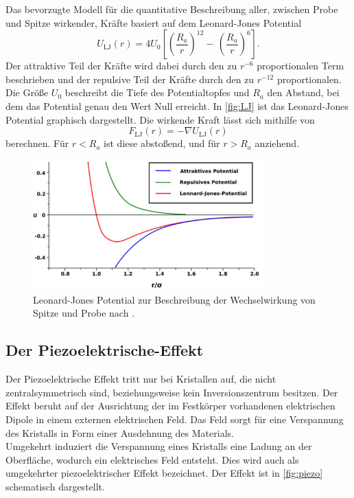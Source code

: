 Das bevorzugte Modell für die quantitative Beschreibung aller, zwischen Probe und Spitze wirkender, Kräfte basiert auf dem Leonard-Jones Potential
\begin{equation}
  U_{\text{LJ}}(r) = 4U_0\left[\left(\frac{R_a}{r}\right)^{12}-\,\left(\frac{R_a}{r}\right)^6\right].
\end{equation}
Der attraktive Teil der Kräfte wird dabei durch den zu $r^{-6}$ proportionalen Term beschrieben und der repulsive Teil der Kräfte durch den zu $r^{-12}$ proportionalen.
Die Größe $U_0$ beschreibt die Tiefe des Potentialtopfes und $R_a$ den Abstand, bei dem das Potential genau den Wert Null erreicht. In \autoref{fig:LJ} ist das Leonard-Jones Potential graphisch dargestellt.
Die wirkende Kraft lässt sich mithilfe von
\begin{equation}
  F_{\text{LJ}}(r) = - \nabla U_{\text{LJ}}(r)
\end{equation}
berechnen. Für $r<R_a$ ist diese abstoßend, und für $r>R_a$ anziehend.
\begin{figure}[H]
  \centering
  \includegraphics[width=0.8\textwidth]{content/plots/LJ.jpg}
  \caption{Leonard-Jones Potential zur Beschreibung der Wechselwirkung von Spitze und Probe nach \cite{Voigt}.}
  \label{fig:LJ}
\end{figure}
\subsection{Der Piezoelektrische-Effekt}
Der Piezoelektrische Effekt tritt nur bei Kristallen auf, die nicht zentralsymmetrisch sind, beziehungsweise kein Inversionszentrum besitzen. Der Effekt beruht auf der Ausrichtung der im Festkörper vorhandenen elektrischen Dipole in einem externen elektrischen Feld. Das Feld sorgt für eine Verspannung des Kristalls in Form einer Ausdehnung des Materials.\\
Umgekehrt induziert die Verspannung eines Kristalls eine Ladung an der Oberfläche, wodurch ein elektrisches Feld entsteht. Dies wird auch als umgekehrter piezoelektrischer Effekt bezeichnet. Der Effekt ist in \autoref{fig:piezo} schematisch dargestellt.

